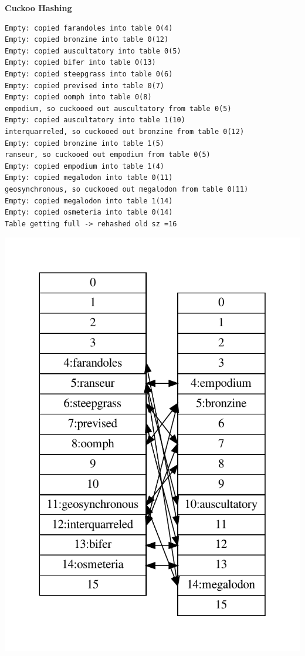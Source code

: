 \newpage
{\samepage
\begin{center}
{\Large{\bf Cuckoo Hashing}}
\end{center}
{\tiny
\begin{verbatim}
Empty: copied farandoles into table 0(4)
Empty: copied bronzine into table 0(12)
Empty: copied auscultatory into table 0(5)
Empty: copied bifer into table 0(13)
Empty: copied steepgrass into table 0(6)
Empty: copied prevised into table 0(7)
Empty: copied oomph into table 0(8)
empodium, so cuckooed out auscultatory from table 0(5)
Empty: copied auscultatory into table 1(10)
interquarreled, so cuckooed out bronzine from table 0(12)
Empty: copied bronzine into table 1(5)
ranseur, so cuckooed out empodium from table 0(5)
Empty: copied empodium into table 1(4)
Empty: copied megalodon into table 0(11)
geosynchronous, so cuckooed out megalodon from table 0(11)
Empty: copied megalodon into table 1(14)
Empty: copied osmeteria into table 0(14)
Table getting full -> rehashed old sz =16
\end{verbatim}
}
\vspace*{-0.5in}
\begin{center}
\includegraphics[scale=1.00]{../Images/cuckoo.pdf}
\end{center}
}

